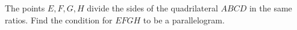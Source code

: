 The points $E, F, G, H$ divide the sides of the quadrilateral $ABCD$ in the same ratios. Find the condition for $EFGH$ to be a parallelogram.
